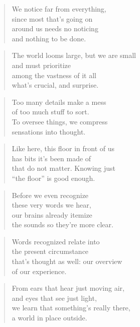\documentclass[14pt,a4paper]{article}
\begin{document}
\begin{verse}
We notice far from everything,\\
since most that’s going on\\
around us needs no noticing\\
and nothing to be done.
\end{verse}

\begin{verse}
The world looms large, but we are small\\
and must prioritize\\
among the vastness of it all\\
what’s crucial, and surprise.
\end{verse}

\begin{verse}
Too many details make a mess\\
of too much stuff to sort.\\
To oversee things, we compress\\
sensations into thought.
\end{verse}

\begin{verse}
Like here, this floor in front of us\\
has bits it’s been made of\\
that do not matter. Knowing just\\
“the floor” is good enough.
\end{verse}

\begin{verse}
Before we even recognize\\
these very words we hear,\\
our brains already itemize\\
the sounds so they’re more clear.
\end{verse}

\begin{verse}
Words recognized relate into\\
the present circumstance\\
that’s thought as well: our overview\\
of our experience.
\end{verse}

\begin{verse}
From ears that hear just moving air,\\
and eyes that see just light,\\
we learn that something’s really there,\\
a world in place outside.
\end{verse}
\end{document}
